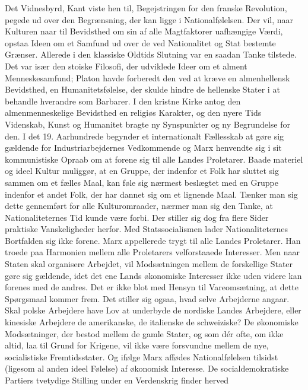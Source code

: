 \documentclass[12pt,a4paper,openany]{book}
\newcommand{\opage}[1]{\marginnote{\footnotesize\textit{[#1]}}}
\begin{document}
Det Vidnesbyrd, Kant viste hen til, Begejstringen for den franske
Revolution, pegede ud over den Begrænsning, der kan ligge i Nationalfølelsen.
Der vil, naar Kulturen naar til Bevidsthed om sin af
alle Magtfaktorer uafhængige Værdi, opstaa Ideen om et Samfund
ud over de ved Nationalitet og Stat bestemte Grænser. Allerede i den
klassiske Oldtids Slutning var en saadan Tanke tilstede. Det var især
den stoiske Filosofi, der udviklede Ideer om et alment Menneskesamfund;
Platon havde forberedt den ved at kræve en almenhellensk
Bevidsthed, en Humanitetsfølelse, der skulde hindre de hellenske Stater
i at behandle hverandre som Barbarer. I den kristne Kirke antog
den almenmenneskelige Bevidsthed en religiøs Karakter, og den
nyere Tids Videnskab, Kunst og Humanitet bragte ny Synspunkter
og ny Begrundelse for den. I det 19. Aarhundrede begynder et internationalt
Fællesskab at gøre sig gældende for Industriarbejdernes
Vedkommende og Marx henvendte sig i sit kommunistiske Opraab
om at forene sig til alle Landes Proletarer. Baade materiel og ideel
Kultur muliggør, at en Gruppe, der indenfor et Folk har sluttet sig
sammen om et fælles Maal, kan føle sig nærmest beslægtet med en
Gruppe indenfor et andet Folk, der har dannet sig om et lignende
Maal. Tænker man sig dette gennemført for alle Kulturomraader,
nærmer man sig den Tanke, at Nationaliteternes Tid kunde være
forbi. Der stiller sig dog fra flere Sider praktiske Vanskeligheder
herfor. Med Statssocialismen lader Nationaliteternes Bortfalden sig
ikke forene. Marx appellerede trygt til alle Landes Proletarer. Han
troede paa Harmonien mellem alle Proletarers velforstaaede Interesser.
Men naar Staten skal organisere Arbejdet, vil Modsætningen
mellem de forskellige Stater gøre sig gældende, idet det ene Lands
økonomiske Interesser ikke uden videre kan forenes med de andres.
\opage{111}Det er ikke blot med Hensyn til Vareomsætning, at dette Spørgsmaal
kommer frem. Det stiller sig ogsaa, hvad selve Arbejderne angaar.
Skal polske Arbejdere have Lov at underbyde de nordiske Landes
Arbejdere, eller kinesiske Arbejdere de amerikanske, de italienske
de schweiziske? De økonomiske Modsætninger, der bestod mellem
de gamle Stater, og som dér ofte, om ikke altid, laa til Grund for
Krigene, vil ikke være forsvundne mellem de nye, socialistiske Fremtidsstater.
Og ifølge Marx affødes Nationalfølelsen tilsidst (ligesom
al anden ideel Følelse) af økonomisk Interesse. De socialdemokratiske
Partiers tvetydige Stilling under en Verdenskrig finder herved
\end{document}
